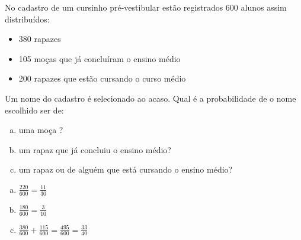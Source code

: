 \begin{ex}
No cadastro de um cursinho pré-vestibular estão registrados 600 alunos assim distribuídos:
   \begin{itemize}
   \item 380 rapazes
   \item 105 moças que já concluíram o ensino médio
   \item 200 rapazes que estão cursando o curso médio
   \end{itemize}
Um nome do cadastro é selecionado ao acaso. Qual é a probabilidade de o nome escolhido ser de:
   \begin{enumerate}[(a)]
   \item uma moça ?
   \item um rapaz que já concluiu o ensino médio?
   \item um rapaz ou de alguém que está cursando o ensino médio?
   \end{enumerate}
     \begin{sol}
       \phantom{A} 
       \begin{enumerate} [(a)]
           \item $\frac{220}{600}=\frac{11}{30}$
           \item $\frac{180}{600}=\frac{3}{10}$
           \item $\frac{380}{600}+\frac{115}{600}=\frac{495}{600}=\frac{33}{40}$
       \end{enumerate}
       
     \end{sol}
\end{ex}